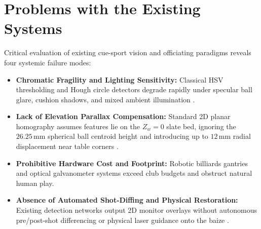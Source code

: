 \section{Problems with the Existing Systems}
Critical evaluation of existing cue-sport vision and officiating paradigms reveals four systemic failure modes:
\begin{itemize}
    \item \textbf{Chromatic Fragility and Lighting Sensitivity:} Classical HSV thresholding and Hough circle detectors degrade rapidly under specular ball glare, cushion shadows, and mixed ambient illumination \cite{ref2, ref4, ref5}.
    \item \textbf{Lack of Elevation Parallax Compensation:} Standard 2D planar homography assumes features lie on the $Z_w=0$ slate bed, ignoring the $26.25\,\text{mm}$ spherical ball centroid height and introducing up to $12\,\text{mm}$ radial displacement near table corners \cite{ref7, ref13}.
    \item \textbf{Prohibitive Hardware Cost and Footprint:} Robotic billiards gantries \cite{ref14, ref15, ref16} and optical galvanometer systems \cite{ref17, ref18} exceed club budgets and obstruct natural human play.
    \item \textbf{Absence of Automated Shot-Diffing and Physical Restoration:} Existing detection networks output 2D monitor overlays without autonomous pre/post-shot differencing or physical laser guidance onto the baize \cite{ref1, ref11, ref12}.
\end{itemize}

